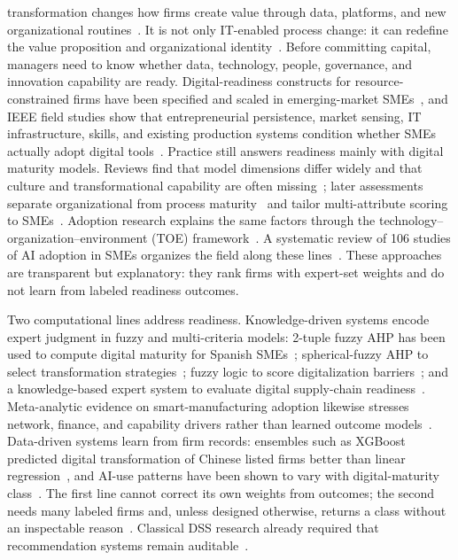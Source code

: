 \documentclass[10pt,journal,compsoc]{IEEEtran}
\begin{document}

 transformation changes how firms create value through data, platforms, and new organizational routines~\cite{vial2019,verhoef2021}. It is not only IT-enabled process change: it can redefine the value proposition and organizational identity~\cite{vial2019,verhoef2021}. Before committing capital, managers need to know whether data, technology, people, governance, and innovation capability are ready. Digital-readiness constructs for resource-constrained firms have been specified and scaled in emerging-market SMEs~\cite{pingali2023}, and IEEE field studies show that entrepreneurial persistence, market sensing, IT infrastructure, skills, and existing production systems condition whether SMEs actually adopt digital tools~\cite{christofi2023,omrani2024,jung2023}. Practice still answers readiness mainly with digital maturity models. Reviews find that model dimensions differ widely and that culture and transformational capability are often missing~\cite{teichert2019,stef2026}; later assessments separate organizational from process maturity~\cite{tubis2023} and tailor multi-attribute scoring to SMEs~\cite{kljajic2021,kargas2023}. Adoption research explains the same factors through the technology--organization--environment (TOE) framework~\cite{tornatzky1990,omrani2024,badghish2024}. A systematic review of 106 studies of AI adoption in SMEs organizes the field along these lines~\cite{schwaeke2025}. These approaches are transparent but explanatory: they rank firms with expert-set weights and do not learn from labeled readiness outcomes.

Two computational lines address readiness. Knowledge-driven systems encode expert judgment in fuzzy and multi-criteria models: 2-tuple fuzzy AHP has been used to compute digital maturity for Spanish SMEs~\cite{marin2023}; spherical-fuzzy AHP to select transformation strategies~\cite{oner2024}; fuzzy logic to score digitalization barriers~\cite{restrepo2024}; and a knowledge-based expert system to evaluate digital supply-chain readiness~\cite{khan2021}. Meta-analytic evidence on smart-manufacturing adoption likewise stresses network, finance, and capability drivers rather than learned outcome models~\cite{kim2023sm}. Data-driven systems learn from firm records: ensembles such as XGBoost predicted digital transformation of Chinese listed firms better than linear regression~\cite{chen2024}, and AI-use patterns have been shown to vary with digital-maturity class~\cite{bratucu2024}. The first line cannot correct its own weights from outcomes; the second needs many labeled firms and, unless designed otherwise, returns a class without an inspectable reason~\cite{barredo2020,adadi2018}. Classical DSS research already required that recommendation systems remain auditable~\cite{shim2002}.
\end{document}
